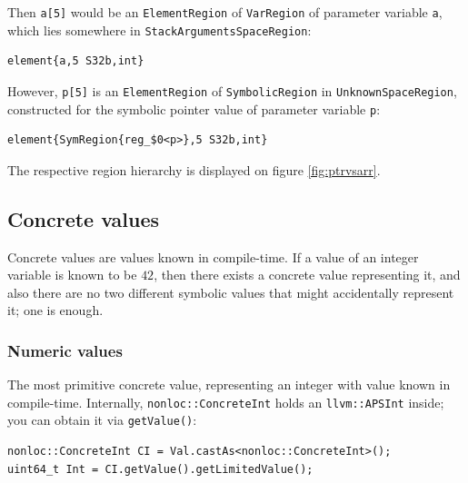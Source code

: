 \documentclass[a4paper,12pt]{article}
\newenvironment{nobr}{\begin{minipage}{\textwidth}\setlength\parskip{1em}
}{\end{minipage}\ignorespacesafterend}
\begin{document}
\begin{nobr}
Then \lstinline|a[5]| would be an \lstinline|ElementRegion| of \lstinline|VarRegion| of parameter variable \lstinline|a|, which lies somewhere in \lstinline|StackArgumentsSpaceRegion|:
\begin{lstlisting}[style=commandline]
element{a,5 S32b,int}
\end{lstlisting}
\end{nobr}

\begin{nobr}
However, \lstinline|p[5]| is an \lstinline|ElementRegion| of \lstinline|SymbolicRegion| in \lstinline|UnknownSpaceRegion|, constructed for the symbolic pointer value of parameter variable \lstinline|p|:
\begin{lstlisting}[style=commandline]
element{SymRegion{reg_$0<p>},5 S32b,int}
\end{lstlisting}
\end{nobr}

The respective region hierarchy is displayed on figure \ref{fig:ptrvsarr}.

\begin{nobr}
\subsection{Concrete values}\label{subsec:ConcreteVal}

Concrete values are values known in compile-time. If a value of an integer variable is known to be $42$, then there exists a concrete value representing it, and also there are no two different symbolic values that might accidentally represent it; one is enough.
\end{nobr}

\begin{nobr}
\subsubsection{Numeric values}

The most primitive concrete value, representing an integer with value known in compile-time. Internally, \lstinline|nonloc::ConcreteInt| holds an \lstinline|llvm::APSInt| inside; you can obtain it via \lstinline|getValue()|:

\begin{lstlisting}[style=cplusplus,numbers=none]
nonloc::ConcreteInt CI = Val.castAs<nonloc::ConcreteInt>();
uint64_t Int = CI.getValue().getLimitedValue();
\end{lstlisting}
\end{nobr}
\end{document}
